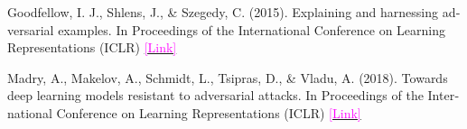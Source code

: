 \begin{latin}
	\begin{thebibliography}{9}
		Goodfellow, I. J., Shlens, J., \& Szegedy, C. (2015). Explaining and harnessing adversarial examples. In Proceedings of the International Conference on Learning Representations (ICLR) \href{https://arxiv.org/abs/1412.6572}{\textcolor{magenta}{[Link]}}
		
		
		
		Madry, A., Makelov, A., Schmidt, L., Tsipras, D., \& Vladu, A. (2018). Towards deep learning models resistant to adversarial attacks. In Proceedings of the International Conference on Learning Representations (ICLR) \href{https://arxiv.org/abs/1706.06083}{\textcolor{magenta}{[Link]}}
	\end{thebibliography} 
\end{latin}








































